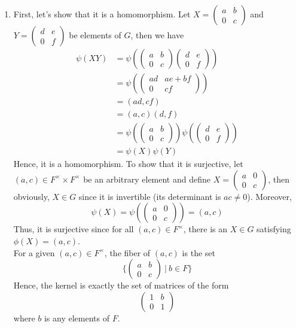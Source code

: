\begin{solution}
\begin{enumerate}[label = \textbf{(\alph*)}]
        \item  First, let's show that it is a homomorphism. Let $X = \begin{pmatrix} a & b \\ 0 & c \end{pmatrix}$ and  $Y = \begin{pmatrix} d & e \\ 0 & f \end{pmatrix}$ be elements of $G$, then we have
        \begin{align*}
            \psi(XY) &= \psi\left(\begin{pmatrix} a & b \\ 0 & c \end{pmatrix} \begin{pmatrix} d & e \\ 0 & f \end{pmatrix}\right)\\
            &= \psi\left(\begin{pmatrix} ad & ae + bf \\ 0 & cf \end{pmatrix}\right) \\
            &= (ad, cf) \\
            &= (a, c)(d, f) \\
            &= \psi\left(\begin{pmatrix} a & b \\ 0 & c \end{pmatrix}\right)\psi\left(\begin{pmatrix} d & e \\ 0 & f \end{pmatrix}\right) \\
            &= \psi(X)\psi(Y)
        \end{align*}
        Hence, it is a homomorphism. To show that it is surjective, let $(a,c) \in F^{\times} \times F^{\times}$ be an arbitrary element and define $X = \begin{pmatrix} a & 0 \\ 0 & c \end{pmatrix}$, then obviously, $X \in G$ since it is invertible (its determinant is $ac \neq 0$). Moreover, 
        $$\psi(X) = \psi\left(\begin{pmatrix} a & 0 \\ 0 & c \end{pmatrix}\right) = (a,c)$$
        Thus, it is surjective since for all $(a,c) \in F^{\times}$, there is an $X \in G$ satisfying $\phi(X) = (a,c)$.\\
        For a given $(a,c) \in F^{\times}$, the fiber of $(a,c)$ is the set 
        $$\{\begin{pmatrix} a & b \\ 0 & c \end{pmatrix} \ | \ b \in F\}$$
        Hence, the kernel is exactly the set of matrices of the form 
        $$\begin{pmatrix} 1 & b \\ 0 & 1 \end{pmatrix}$$
        where $b$ is any elements of $F$.


\end{enumerate}
\end{solution}
